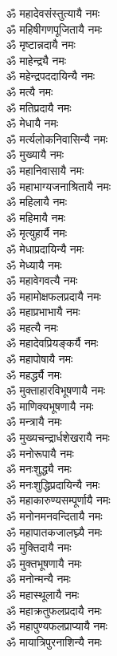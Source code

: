\begin{flushleft}
\begin{multicols}{2}
ॐ महादेवसंस्तुत्यायै नमः\\
ॐ महिषीगणपूजितायै नमः\\
ॐ मृष्टान्नदायै नमः\\
ॐ माहेन्द्र्यै नमः\\
ॐ महेन्द्रपददायिन्यै नमः\\
ॐ मत्यै नमः\\
ॐ मतिप्रदायै नमः\hfill{}\\
ॐ मेधायै नमः\\
ॐ मर्त्यलोकनिवासिन्यै नमः\\
ॐ मुख्यायै नमः\\
ॐ महानिवासायै नमः\\
ॐ महाभाग्यजनाश्रितायै नमः\\
ॐ महिलायै नमः\\
ॐ महिमायै नमः\\
ॐ मृत्युहार्यै नमः\\
ॐ मेधाप्रदायिन्यै नमः\\
ॐ मेध्यायै नमः\hfill{}\\
ॐ महावेगवत्यै नमः\\
ॐ महामोक्षफलप्रदायै नमः\\
ॐ महाप्रभाभायै नमः\\
ॐ महत्यै नमः\\
ॐ महादेवप्रियङ्कर्यै नमः\\
ॐ महापोषायै नमः\\
ॐ महर्द्ध्यै नमः\\
ॐ मुक्ताहारविभूषणायै नमः\\
ॐ माणिक्यभूषणायै नमः\\
ॐ मन्त्रायै नमः\hfill{}\\
ॐ मुख्यचन्द्रार्धशेखरायै नमः\\
ॐ मनोरूपायै नमः\\
ॐ मनःशुद्ध्यै नमः\\
ॐ मनःशुद्धिप्रदायिन्यै नमः\\
ॐ महाकारुण्यसम्पूर्णायै नमः\\
ॐ मनोनमनवन्दितायै नमः\\
ॐ महापातकजालघ्न्यै नमः\\
ॐ मुक्तिदायै नमः\\
ॐ मुक्तभूषणायै नमः\\
ॐ मनोन्मन्यै नमः\hfill{}\\
ॐ महास्थूलायै नमः\\
ॐ महाक्रतुफलप्रदायै नमः\\
ॐ महापुण्यफलप्राप्यायै नमः\\
ॐ मायात्रिपुरनाशिन्यै नमः\\

\end{multicols}
\end{flushleft}
